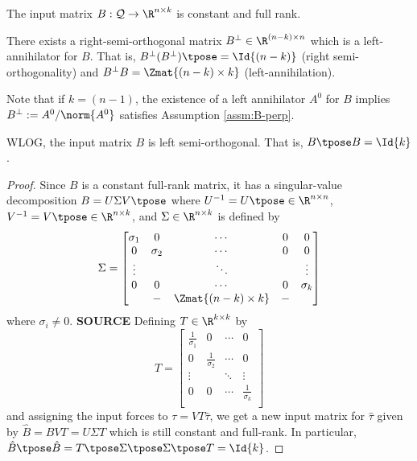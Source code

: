 \begin{assm}\label{assm:B-const}
    The input matrix \(B : \mathcal{Q} \rightarrow \R^{n\times k}\) is constant
    and full rank.
\end{assm}
\begin{assm}\label{assm:B-perp}
    There exists a right-semi-orthogonal matrix 
    \(B^\perp \in \R^{(n-k)\times n}\)
    which is a left-annihilator for \(B\). That is,
    \(B^\perp(B^\perp)\tpose = \Id{(n-k)}\) (right semi-orthogonality) and
    \(B^\perp B = \Zmat{(n-k) \times k}\) (left-annihilation).
\end{assm}

Note that if \(k = (n-1)\), the existence of a left annihilator \(A^0\) for
\(B\) implies \(B^\perp := A^0/\norm{A^0}\) satisfies Assumption
\ref{assm:B-perp}.

\begin{assm}\label{assm:B-orthogonal}
    WLOG, the input matrix \(B\) is left semi-orthogonal. 
    That is, \(B\tpose B = \Id{k}\).
\end{assm}
\begin{proof}
Since \(B\) is a constant full-rank matrix, 
it has a singular-value decomposition 
\(B = U \Sigma V\tpose\) where \(U^{-1} = U\tpose \in \R^{n \times n}\), 
\(V^{-1} = V\tpose \in \R^{n \times k}\), and \(\Sigma \in \R^{n \times k}\) is
defined by
\[
    \Sigma = \begin{bmatrix}
        \sigma_1 & 0 & \cdots & 0 & 0 \\
        0 & \sigma_2 & \cdots & 0 & 0 \\
        \vdots & & \ddots &  & \vdots \\
        0 & 0 & \cdots & 0 & \sigma_k \\
          & - & \Zmat{(n-k)\times k} & -  &\\
    \end{bmatrix}
\]
where \(\sigma_i \neq 0\).
\textbf{SOURCE}
Defining \(T \in \R^{k \times k}\) by
\[
    T = \begin{bmatrix}
        \frac{1}{\sigma_1} & 0 & \cdots & 0 \\
        0 & \frac{1}{\sigma_2} & \cdots & 0 \\
    \vdots & & \ddots & \vdots \\
    0 & 0 & \cdots & \frac{1}{\sigma_k} \\
    \end{bmatrix}
\]
and assigning the input forces to \(\tau = V T \hat{\tau}\), we get a new input
matrix for \(\hat{\tau}\) given by \(\hat{B} = B V T = U \Sigma T\) 
which is still constant and full-rank. In particular, 
\(\hat{B}\tpose \hat{B} = T\tpose \Sigma\tpose \Sigma\tpose T = \Id{k}\).
\end{proof}

